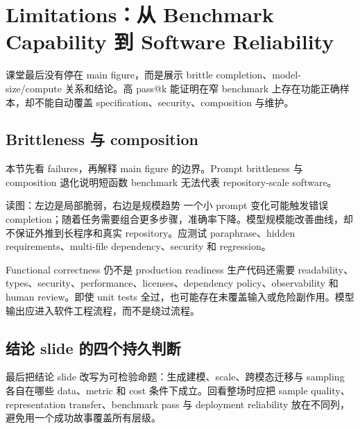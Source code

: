 \section{Limitations：从 Benchmark Capability 到 Software Reliability}

课堂最后没有停在 main figure，而是展示 brittle completion、model-size/compute 关系和结论。高 pass@k 能证明在窄 benchmark 上存在功能正确样本，却不能自动覆盖 specification、security、composition 与维护。

\subsection{Brittleness 与 composition}

本节先看 failures，再解释 main figure 的边界。Prompt brittleness 与 composition 退化说明短函数 benchmark 无法代表 repository-scale software。


\begin{knowledgebox}{读图：左边是局部脆弱，右边是规模趋势}
一个小 prompt 变化可能触发错误 completion；随着任务需要组合更多步骤，准确率下降。模型规模能改善曲线，却不保证外推到长程序和真实 repository。应测试 paraphrase、hidden requirements、multi-file dependency、security 和 regression。
\end{knowledgebox}

\begin{warningbox}{Functional correctness 仍不是 production readiness}
生产代码还需要 readability、types、security、performance、licenses、dependency policy、observability 和 human review。即使 unit tests 全过，也可能存在未覆盖输入或危险副作用。模型输出应进入软件工程流程，而不是绕过流程。
\end{warningbox}

\subsection{结论 slide 的四个持久判断}

最后把结论 slide 改写为可检验命题：生成建模、scale、跨模态迁移与 sampling 各自在哪些 data、metric 和 cost 条件下成立。回看整场时应把 sample quality、representation transfer、benchmark pass 与 deployment reliability 放在不同列，避免用一个成功故事覆盖所有层级。


